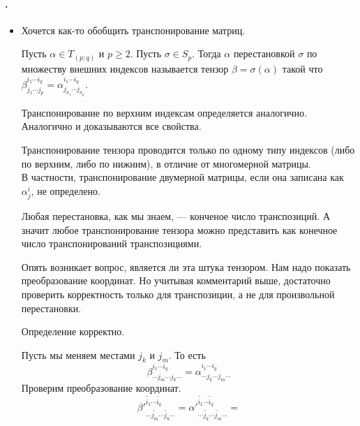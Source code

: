 \documentclass{article}
\begin{document}
    \paragraph{.}
    \begin{itemize}
        \item[]
        \begin{Comment}
            Хочется как-то обобщить транспонирование матриц.
        \end{Comment}
        \dfn Пусть $\alpha\in T_{(p;q)}$ и $p\geqslant2$. Пусть $\sigma\in S_p$. Тогда  $\alpha$ перестановкой $\sigma$ по множеству внешних индексов называется тензор $\beta=\sigma(\alpha)$ такой что $\beta^{i_1\cdots i_q}_{j_1\cdots j_p}=\alpha^{i_1\cdots i_q}_{j_{\sigma_1}\cdots j_{\sigma_p}}$.
        \begin{Comment}
            Транспонирование по верхним индексам определяется аналогично. Аналогично и доказываются все свойства.
        \end{Comment}
        \begin{Comment}
            Транспонирование тензора проводится только по одному типу индексов (либо по верхним, либо по нижним), в отличие от многомерной матрицы.\\
            В частности, транспонирование двумерной матрицы, если она записана как $\alpha^i_j$, не определено.
        \end{Comment}
        \begin{Comment}
            Любая перестановка, как мы знаем, --- конченое число транспозиций. А значит любое транспонирование тензора можно представить как конечное число транспонирований транспозициями.
        \end{Comment}
        \begin{Comment}
            Опять возникает вопрос, является ли эта штука тензором. Нам надо показать преобразование координат. Но учитывая комментарий выше, достаточно проверить корректность только для транспозиции, а не для произвольной перестановки.
        \end{Comment}
        \thm Определение корректно.
        \begin{Proof}
            Пусть мы меняем местами $j_k$ и $j_m$. То есть
            $$
            \beta^{i_1\cdots i_q}_{\cdots j_m\cdots j_k\cdots}=\alpha^{i_1\cdots i_q}_{\cdots j_k\cdots j_m\cdots}
            $$
            Проверим преобразование координат.
            \[
            {\beta'}^{\widetilde{i_1}\cdots\widetilde{i_q}}_{\cdots\widetilde{j_m}\cdots\widetilde{j_k}\cdots}={\alpha'}^{\widetilde{i_1}\cdots\widetilde{i_q}}_{\cdots\widetilde{j_k}\cdots\widetilde{j_m}\cdots}=
\]
\end{Proof}
\end{itemize}
\end{document}
